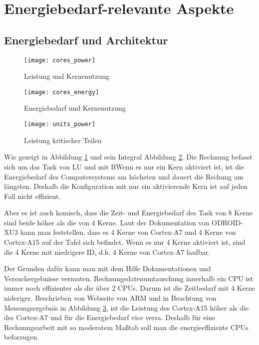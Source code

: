 \section{Energiebedarf-relevante Aspekte}
\label{sec:Energiebedarf-relevante Aspekte}
\subsection{Energiebedarf und Architektur}

\begin{figure}[ht]
\texttt{[image: cores\_power]}
\caption[Leistung und Kernenutzung]{Leistung und Kernenutzung}
\label{fig:Leistung und Kernenutzung}
\end{figure}

\begin{figure}[ht]
\texttt{[image: cores\_energy]}
\caption[Energiebedarf und Kernenutzung]{Energiebedarf und Kernenutzung}
\label{fig:Energiebedarf und Kernenutzung}
\end{figure}

\begin{figure}[ht]
\texttt{[image: units\_power]}
\caption[Leistung kritischer Teilen]{Leistung kritischer Teilen}
\label{fig:Leistung kritischer Teilen}
\end{figure}

Wie gezeigt in Abbildung \ref{fig:Leistung und Kernenutzung} und sein Integral Abbildung \ref{fig:Energiebedarf und Kernenutzung}. Die Rechnung befasst sich um das Task von LU und mit BWenn es nur ein Kern aktiviert ist, ist die Energiebedarf des Computersystems am höchsten und dauert die Rechung am längsten. Deshalb die Konfiguration mit nur ein aktivierende Kern ist auf jeden Fall nicht effizient. 

Aber es ist auch komisch, dass die Zeit- und Energiebedarf des Task von 8 Kerne sind beide höher als die von 4 Kerne. Laut der Dokumentation von ODROID-XU3 kann man feststellen, dass es 4 Kerne von Cortex-A7 und 4 Kerne von Cortex-A15 auf der Tafel sich befindet. Wenn es nur 4 Kerne aktiviert ist, sind die 4 Kerne mit niedrigere ID, d.h. 4 Kerne von Cortex-A7 laufbar. 

Der Grunden dafür kann man mit dem Hilfe Dokumentationen und Versuchergebnisse vermuten. Rechnungsdatenumtauschung innerhalb ein CPU ist immer noch effizienter als die über 2 CPUs. Darum ist die Zeitbedarf mit 4 Kerne nideriger. Beschrieben von Webseite von ARM und in Beachtung von Messungsergebnis in Abbildung \ref{fig:Leistung kritischer Teilen}, ist die Leistung des Cortex-A15 höher als die des Cortex-A7 und für die Energiebedarf vice versa. Deshalb für eine Rechnungsarbeit mit so moderatem Maßtab soll man die energieeffiziente CPUs beforzugen.